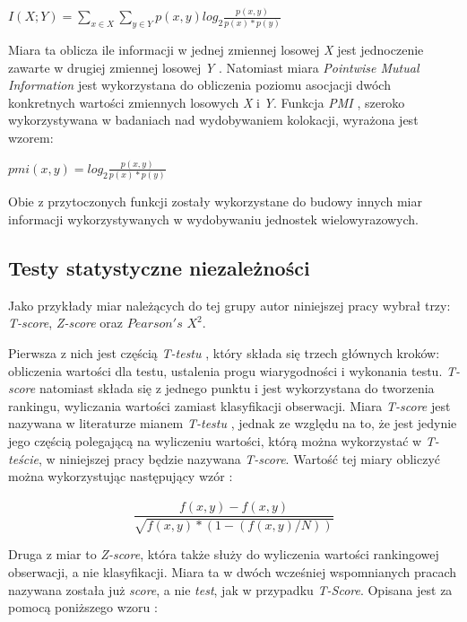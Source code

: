\begin{center}
\( I(X; Y) = \sum_{x \in X} \sum_{y \in Y} p(x, y) log_{2} \frac{p(x, y)}{p(x) * p(y)} \)
\end{center}

Miara ta oblicza ile informacji w jednej zmiennej losowej \emph{X} jest jednoczenie zawarte w drugiej zmiennej losowej \emph{Y} \cite[str. 2]{mmi_w11}.
Natomiast miara \emph{Pointwise Mutual Information} jest wykorzystana do obliczenia poziomu asocjacji dwóch konkretnych wartości zmiennych losowych \emph{X} i \emph{Y}.
Funkcja \emph{PMI} \cite[str. 2]{mmi_w11}, szeroko wykorzystywana w badaniach nad wydobywaniem kolokacji, wyrażona jest wzorem:

\begin{center}
\( pmi(x, y) = log_{2} \frac{p(x, y)}{p(x) * p(y)} \)
\end{center}

Obie z przytoczonych funkcji zostały wykorzystane do budowy innych miar informacji wykorzystywanych w wydobywaniu jednostek wielowyrazowych.


\subsection{Testy statystyczne niezależności}
Jako przykłady miar należących do tej grupy autor niniejszej pracy wybrał trzy: \emph{T-score}, \emph{Z-score} oraz $ Pearson's $ $ X^2 $.
\par
Pierwsza z nich jest częścią \emph{T-testu} \cite[str. 166]{mit}, który składa się trzech głównych kroków: obliczenia wartości dla testu, ustalenia progu wiarygodności i wykonania testu. 
\emph{T-score} natomiast składa się z jednego punktu i jest wykorzystana do tworzenia rankingu, wyliczania wartości zamiast klasyfikacji obserwacji.
Miara \emph{T-score} jest nazywana w literaturze mianem \emph{T-testu} \cite[str. 3]{coling}\cite[str. 18]{pecina_measures}, jednak ze względu na to, że jest jedynie jego częścią polegającą na wyliczeniu wartości, którą można wykorzystać w \emph{T-teście}, w niniejszej pracy będzie nazywana \emph{T-score}.
Wartość tej miary obliczyć można wykorzystując następujący wzór \cite[str. 18]{pecina_measures}:

$$ \frac{f(x, y) - \hat{f}(x, y) }{\sqrt{f(x, y) * (1 - (f(x, y) / N))}} $$

\par
Druga z miar to \emph{Z-score}, która także służy do wyliczenia wartości rankingowej obserwacji, a nie klasyfikacji.
Miara ta w dwóch wcześniej wspomnianych pracach \cite[str. 3]{coling}\cite[str. 18]{pecina_measures} nazywana została już \emph{score}, a nie \emph{test}, jak w przypadku \emph{T-Score}.
Opisana jest za pomocą poniższego wzoru \cite[str. 18]{pecina_measures}:

